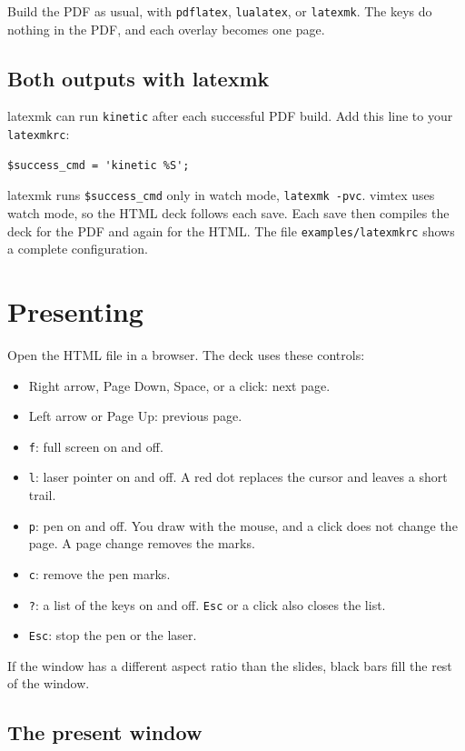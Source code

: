\documentclass[11pt]{article}
\newcommand{\cmd}[1]{\texttt{#1}}
\begin{document}
Build the PDF as usual, with \cmd{pdflatex}, \cmd{lualatex}, or \cmd{latexmk}.
The keys do nothing in the PDF, and each overlay becomes one page.

\subsection{Both outputs with latexmk}

latexmk can run \cmd{kinetic} after each successful PDF build. Add this line to
your \cmd{latexmkrc}:
\begin{lstlisting}
$success_cmd = 'kinetic %S';
\end{lstlisting}
latexmk runs \cmd{\$success\_cmd} only in watch mode, \cmd{latexmk -pvc}. vimtex
uses watch mode, so the HTML deck follows each save. Each save then compiles the
deck for the PDF and again for the HTML. The file
\cmd{examples/latexmkrc} shows a complete configuration.

\section{Presenting}

Open the HTML file in a browser. The deck uses these controls:
\begin{itemize}
	\item Right arrow, Page Down, Space, or a click: next page.
	\item Left arrow or Page Up: previous page.
	\item \cmd{f}: full screen on and off.
	\item \cmd{l}: laser pointer on and off. A red dot replaces the cursor and
	      leaves a short trail.
	\item \cmd{p}: pen on and off. You draw with the mouse, and a click does not
	      change the page. A page change removes the marks.
	\item \cmd{c}: remove the pen marks.
	\item \cmd{?}: a list of the keys on and off. \cmd{Esc} or a click also closes
	      the list.
	\item \cmd{Esc}: stop the pen or the laser.
\end{itemize}

If the window has a different aspect ratio than the slides, black bars fill the
rest of the window.

\subsection{The present window}
\end{document}
